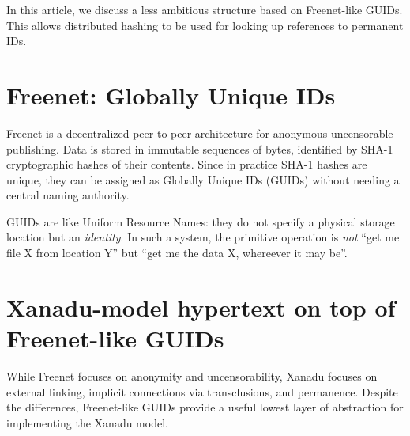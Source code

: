 \documentclass{sig-alternate}
\begin{document}
In this article, we discuss a less ambitious structure
based on Freenet-like GUIDs.
This allows
distributed hashing\cite{ratnasamy00scalable,stoica01chord}
to be used for looking up references to permanent IDs.

% 
% 




\section{Freenet: Globally Unique IDs}

Freenet\cite{freenet,freenet-ieee} is a decentralized peer-to-peer architecture
for anonymous uncensorable publishing.
Data is stored in immutable sequences of bytes, identified
by SHA-1 cryptographic hashes\cite{fips-sha-1} of their contents. 
Since in practice
SHA-1 hashes are unique, they can be assigned as Globally Unique IDs
(GUIDs) without needing a central naming authority.

GUIDs are like Uniform Resource Names\cite{rfc1737}: 
they do not specify a physical
storage location but an \emph{identity}. 
In such a system, the primitive operation is \emph{not} ``get me file X
from location Y'' but ``get me the data X, whereever it may be''.

\section{Xanadu-model hypertext on top of Freenet-like GUIDs}

While Freenet focuses on
anonymity and uncensorability,
Xanadu focuses on 
external linking, implicit connections via transclusions, and
permanence.
Despite the differences, 
Freenet-like GUIDs provide a useful lowest layer of abstraction
for implementing the Xanadu model.
\end{document}
